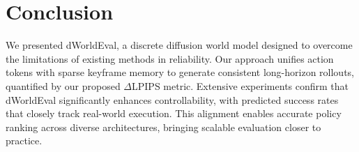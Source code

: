 \section{Conclusion}
We presented dWorldEval, a discrete diffusion world model designed to overcome the limitations of existing methods in reliability. 
Our approach unifies action tokens with sparse keyframe memory to generate consistent long-horizon rollouts, quantified by our proposed $\Delta$LPIPS metric. 
Extensive experiments confirm that dWorldEval significantly enhances controllability, with predicted success rates that closely track real-world execution. 
This alignment enables accurate policy ranking across diverse architectures, bringing scalable evaluation closer to practice.